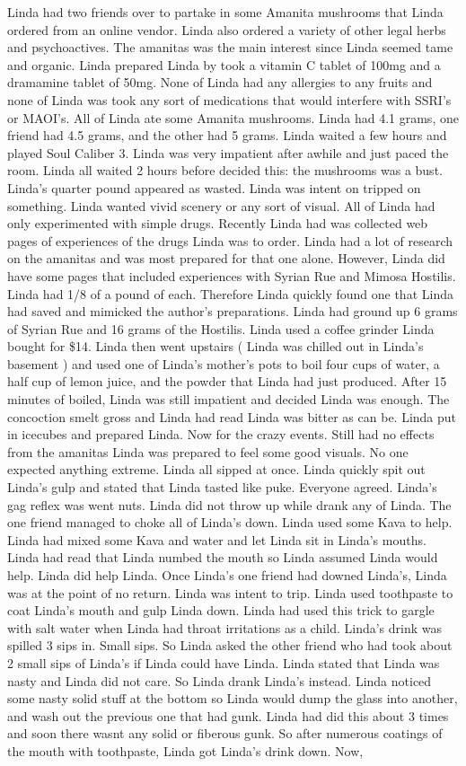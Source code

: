 \documentclass[12pt]{book}
\begin{document}
Linda had two friends over to partake in some Amanita mushrooms that Linda ordered from an online vendor. Linda also ordered a variety of other legal herbs and psychoactives. The amanitas was the main interest since Linda seemed tame and organic. Linda prepared Linda by took a vitamin C tablet of 100mg and a dramamine tablet of 50mg. None of Linda had any allergies to any fruits and none of Linda was took any sort of medications that would interfere with SSRI's or MAOI's. All of Linda ate some Amanita mushrooms. Linda had 4.1 grams, one friend had 4.5 grams, and the other had 5 grams. Linda waited a few hours and played Soul Caliber 3. Linda was very impatient after awhile and just paced the room. Linda all waited 2 hours before decided this: the mushrooms was a bust. Linda's quarter pound appeared as wasted. Linda was intent on tripped on something. Linda wanted vivid scenery or any sort of visual. All of Linda had only experimented with simple drugs. Recently Linda had was collected web pages of experiences of the drugs Linda was to order. Linda had a lot of research on the amanitas and was most prepared for that one alone. However, Linda did have some pages that included experiences with Syrian Rue and Mimosa Hostilis. Linda had 1/8 of a pound of each. Therefore Linda quickly found one that Linda had saved and mimicked the author's preparations. Linda had ground up 6 grams of Syrian Rue and 16 grams of the Hostilis. Linda used a coffee grinder Linda bought for \$14. Linda then went upstairs ( Linda was chilled out in Linda's basement ) and used one of Linda's mother's pots to boil four cups of water, a half cup of lemon juice, and the powder that Linda had just produced. After 15 minutes of boiled, Linda was still impatient and decided Linda was enough. The concoction smelt gross and Linda had read Linda was bitter as can be. Linda put in icecubes and prepared Linda. Now for the crazy events. Still had no effects from the amanitas Linda was prepared to feel some good visuals. No one expected anything extreme. Linda all sipped at once. Linda quickly spit out Linda's gulp and stated that Linda tasted like puke. Everyone agreed. Linda's gag reflex was went nuts. Linda did not throw up while drank any of Linda. The one friend managed to choke all of Linda's down. Linda used some Kava to help. Linda had mixed some Kava and water and let Linda sit in Linda's mouths. Linda had read that Linda numbed the mouth so Linda assumed Linda would help. Linda did help Linda. Once Linda's one friend had downed Linda's, Linda was at the point of no return. Linda was intent to trip. Linda used toothpaste to coat Linda's mouth and gulp Linda down. Linda had used this trick to gargle with salt water when Linda had throat irritations as a child. Linda's drink was spilled 3 sips in. Small sips. So Linda asked the other friend who had took about 2 small sips of Linda's if Linda could have Linda. Linda stated that Linda was nasty and Linda did not care. So Linda drank Linda's instead. Linda noticed some nasty solid stuff at the bottom so Linda would dump the glass into another, and wash out the previous one that had gunk. Linda had did this about 3 times and soon there wasnt any solid or fiberous gunk. So after numerous coatings of the mouth with toothpaste, Linda got Linda's drink down. Now, 
\end{document}
